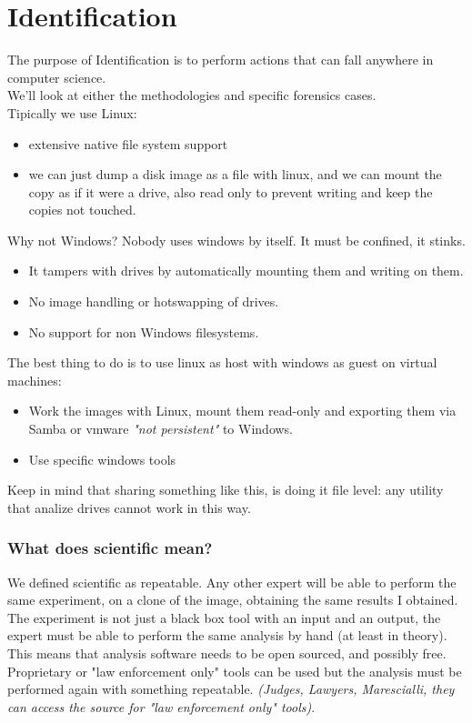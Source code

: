 \chapter{Identification}
    The purpose of Identification is to perform actions that can fall anywhere in computer science.\\
    We'll look at either the methodologies and specific forensics cases.\\
    Tipically we use Linux:
    \begin{itemize}
        \item extensive native file system support 
        \item we can just dump a disk image as a file with linux, and we can mount the copy as if it were a drive, also read only to prevent writing and keep the copies not touched.
    \end{itemize}
    Why not Windows? Nobody uses windows by itself. It must be confined, it stinks.
    \begin{itemize}
        \item It tampers with drives by automatically mounting them and writing on them.
        \item No image handling or hotswapping of drives.
        \item No support for non Windows filesystems.
    \end{itemize}
    The best thing to do is to use linux as host with windows as guest on virtual machines:
    \begin{itemize}
        \item Work the images with Linux, mount them read-only and exporting them via Samba or vmware \textit{"not persistent"} to Windows.
        \item Use specific windows tools
    \end{itemize}
    Keep in mind that sharing something like this, is doing it file level: any utility that analize drives cannot work in this way.
    \subsection{What does scientific mean?}
        We defined scientific as repeatable. Any other expert will be able to perform the same experiment, on a clone of the image, obtaining the same results I obtained.\\
        The experiment is not just a black box tool with an input and an output, the expert must be able to perform the same analysis by hand (at least in theory). This means that analysis software needs to be open sourced, and possibly free. Proprietary or "law enforcement only" tools can be used but the analysis must be performed again with something repeatable. \textit{(Judges, Lawyers, Marescialli, they can access the source for "law enforcement only" tools)}.
